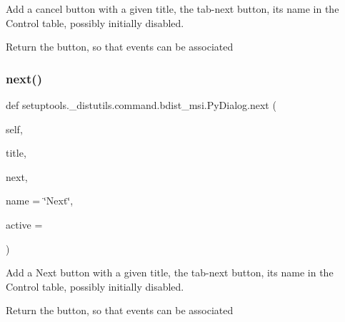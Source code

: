 \begin{DoxyVerb}Add a cancel button with a given title, the tab-next button,
its name in the Control table, possibly initially disabled.

Return the button, so that events can be associated\end{DoxyVerb}
 \mbox{\label{classsetuptools_1_1__distutils_1_1command_1_1bdist__msi_1_1PyDialog_a1efb0f524d983d5542c03b42c60fc2a5}} 
\subsubsection{\texorpdfstring{next()}{next()}}
{\footnotesize\ttfamily def setuptools.\+\_\+distutils.\+command.\+bdist\+\_\+msi.\+Py\+Dialog.\+next (\begin{DoxyParamCaption}\item[{}]{self,  }\item[{}]{title,  }\item[{}]{next,  }\item[{}]{name = {\ttfamily \char`\"{}Next\char`\"{}},  }\item[{}]{active = {} }\end{DoxyParamCaption})}

\begin{DoxyVerb}Add a Next button with a given title, the tab-next button,
its name in the Control table, possibly initially disabled.

Return the button, so that events can be associated\end{DoxyVerb}
 \mbox{\label{classsetuptools_1_1__distutils_1_1command_1_1bdist__msi_1_1PyDialog_afd4e5f519d41b9339a54931a77e797c3}} 
